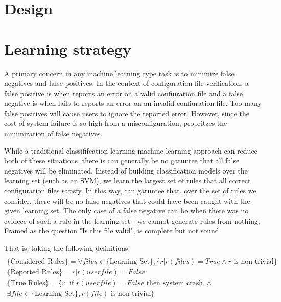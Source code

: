 
\section{\app Design}


\section{Learning strategy}

A primary concern in any machine learning type task is to minimize false negatives and false positives.
In the context of configuration file verification,
  a false positive is when \app reports an error on a valid confiuration file and
  a false negative is when \app fails to reports an error on an invalid confiuration file.
Too many false positives will cause users to ignore the reported error\cite{}.
However, since the cost of system failure is so high from a misconfiguration, \app propritzes the minimization of false negatives.

While a traditional classififcation learning machine learning approach can reduce both of these situations, there is can generally be no garuntee that all false negatives will be eliminated.
Instead of building classification models over the learning set (such as an SVM), we learn the largest set of rules that all correct configuration files satisfy.
In this way, \app can garuntee that, over the set of rules we consider, there will be no false negatives that could have been caught with the given learning set.
The only case of a false negative can be when there was no evidece of such a rule in the learning set - we cannot generate rules from nothing.
Framed as the question "Is this file valid", \app is complete but not sound 

That is, taking the following definitions:
\begin{multline*}\\
\text{\{Considered Rules\}} = \forall files \in \text{\{Learning Set\}}, \{ r | r(files) = True \land r \text{ is non-trivial}\}\\
\text{\{Reported Rules\}} = {r | r(userfile)=False } \\
\text{\{True Rules\}} = \{r | \text{ if } r(userfile)=False \text{ then system crash } \land \\
   \exists file \in \text{\{Learning Set\}}, r(file) \text{ is non-trivial}\}
\end{multline*}

